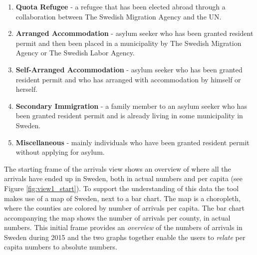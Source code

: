 \documentclass{acmtog} %
\begin{document}
\begin{enumerate}
\item \textbf{Quota Refugee} - a refugee that has been elected abroad through a collaboration between The Swedish Migration Agency and the UN.
\item \textbf{Arranged Accommodation} - asylum seeker who has been granted resident permit and then been placed in a municipality by The Swedish Migration Agency or The Swedish Labor Agency.
\item \textbf{Self-Arranged Accommodation} - asylum seeker who has been granted resident permit and who has arranged with accommodation by himself or herself.
\item \textbf{Secondary Immigration} - a family member to an asylum seeker who has been granted resident permit and is already living in some municipality in Sweden.
\item \textbf{Miscellaneous} - mainly individuals who have been granted resident permit without applying for asylum. 
\end{enumerate} 

The starting frame of the arrivals view shows an overview of where all the arrivals have ended up in Sweden, both in actual numbers and per capita (see Figure \ref{fig:view1_start}). To support the understanding of this data the tool makes use of a map of Sweden, next to a bar chart. The map is a choropleth, where the counties are colored by number of arrivals per capita. The bar chart accompanying the map shows the number of arrivals per county, in actual numbers. This initial frame provides an \emph{overview} of the numbers of arrivals in Sweden during 2015 and the two graphs together enable the users to \emph{relate} per capita numbers to absolute numbers.
\end{document}
